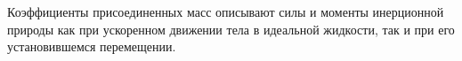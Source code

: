 \begin{frame}
\vfill

Коэффициенты присоединенных масс описывают силы и моменты инерционной природы как при ускоренном движении тела в идеальной жидкости, так и при его установившемся перемещении. %

%
%
%
%
%


\end{frame}


